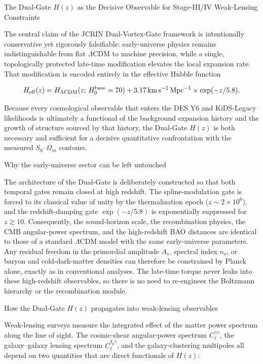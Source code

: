 The Dual-Gate \(H(z)\) as the Decisive Observable for Stage-III/IV Weak-Lensing Constraints

The central claim of the JCRIN Dual-Vortex-Gate framework is intentionally conservative yet rigorously falsifiable: early-universe physics remains indistinguishable from flat \(\Lambda\)CDM to machine precision, while a single, topologically protected late-time modification elevates the local expansion rate. That modification is encoded entirely in the effective Hubble function

\[
H_{\rm eff}(z) = H_{\Lambda{\rm CDM}}(z;\,H_0^{\rm base}=70) + 3.17\,\mathrm{km\,s^{-1}\,Mpc^{-1}}\times\exp(-z/5.8).
\]

Because every cosmological observable that enters the DES Y6 and KiDS-Legacy likelihoods is ultimately a functional of the background expansion history and the growth of structure sourced by that history, the Dual-Gate \(H(z)\) is both necessary and sufficient for a decisive quantitative confrontation with the measured \(S_8\)–\(\Omega_m\) contours.

Why the early-universe sector can be left untouched

The architecture of the Dual-Gate is deliberately constructed so that both temporal gates remain closed at high redshift. The spline-modulation gate is forced to its classical value of unity by the thermalization epoch (\(z\sim 2\times10^6\)), and the redshift-damping gate \(\exp(-z/5.8)\) is exponentially suppressed for \(z\gtrsim10\). Consequently, the sound-horizon scale, the recombination physics, the CMB angular-power spectrum, and the high-redshift BAO distances are identical to those of a standard \(\Lambda\)CDM model with the same early-universe parameters. Any residual freedom in the primordial amplitude \(A_s\), spectral index \(n_s\), or baryon and cold-dark-matter densities can therefore be constrained by Planck alone, exactly as in conventional analyses. The late-time torque never leaks into these high-redshift observables, so there is no need to re-engineer the Boltzmann hierarchy or the recombination module.

How the Dual-Gate \(H(z)\) propagates into weak-lensing observables

Weak-lensing surveys measure the integrated effect of the matter power spectrum along the line of sight. The cosmic-shear angular-power spectrum \(C_\ell^{\gamma\gamma}\), the galaxy–galaxy lensing spectrum \(C_\ell^{\delta_g\gamma}\), and the galaxy-clustering multipoles all depend on two quantities that are direct functionals of \(H(z)\):

